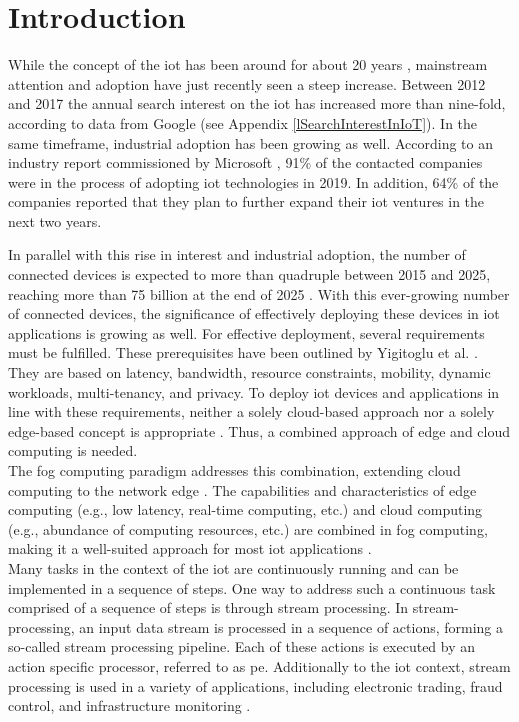 \section{Introduction}
\label{lIntroduction}
While the concept of the \gls{iot} has been around for about 20 years \cite{Hutchison.2010}, mainstream attention and adoption have just recently seen a steep increase. Between 2012 and 2017 the annual search interest on the \gls{iot} has increased more than nine-fold, according to data from Google (see Appendix \ref{lSearchInterestInIoT}). In the same timeframe, industrial adoption has been growing as well. According to an industry report commissioned by Microsoft \cite{Microsoft.2020}, 91\% of the contacted companies were in the process of adopting \gls{iot} technologies in 2019. In addition, 64\% of the companies reported that they plan to further expand their \gls{iot} ventures in the next two years.\par
In parallel with this rise in interest and industrial adoption, the number of connected devices is expected to more than quadruple between 2015 and 2025, reaching more than 75 billion at the end of 2025 \cite{B.Safaei.2017}. With this ever-growing number of connected devices, the significance of effectively deploying these devices in \gls{iot} applications is growing as well. For effective deployment, several requirements must be fulfilled. These prerequisites have been outlined by Yigitoglu et al. \cite{Yigitoglu.2017}. They are based on latency, bandwidth, resource constraints, mobility, dynamic workloads, multi-tenancy, and privacy. To deploy \gls{iot} devices and applications in line with these requirements, neither a solely cloud-based approach nor a solely edge-based concept is appropriate \cite{Yousefpour.2019}. Thus, a combined approach of edge and cloud computing is needed.\\
The fog computing paradigm addresses this combination, extending cloud computing to the network edge \cite{Bonomi.2012}. The capabilities and characteristics of edge computing (e.g., low latency, real-time computing, etc.) and cloud computing (e.g., abundance of computing resources, etc.) are combined in fog computing, making it a well-suited approach for most \gls{iot} applications \cite{Yousefpour.2019}.\\
Many tasks in the context of the \gls{iot} are continuously running and can be implemented in a sequence of steps. One way to address such a continuous task comprised of a sequence of steps is through stream processing. In stream-processing, an input data stream is processed in a sequence of actions, forming a so-called stream processing pipeline. Each of these actions is executed by an action specific processor, referred to as \gls{pe}. Additionally to the \gls{iot} context, stream processing is used in a variety of applications, including electronic trading, fraud control, and infrastructure monitoring \cite{Stonebraker.2005}.\\
